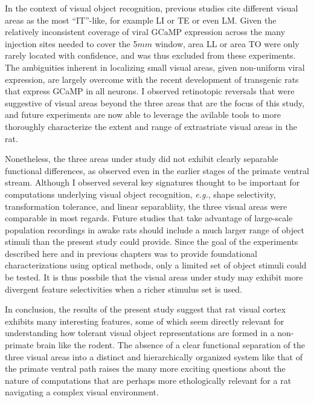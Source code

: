In the context of visual object recognition, previous studies cite different visual areas as the most ``IT''-like, for example LI\cite{Tafazoli2017, Matteucci2019b} or TE\cite{Vermaercke2015, Vermaercke2014} or even LM\cite{Froudarakis2020}. Given the relatively inconsistent coverage of viral GCaMP expression across the many injection sites needed to cover the 5$mm$ window, area LL or area TO were only rarely located with confidence, and was thus excluded from these experiments. The ambiguities inherent in localizing small visual areas, given non-uniform viral expression, are largely overcome with the recent development of transgenic rats that express GCaMP in all neurons\cite{Scott2018}. I observed retinotopic reversals that were suggestive of visual areas beyond the three areas that are the focus of this study, and future experiments are now able to leverage the avilable tools to more thoroughly characterize the extent and range of extrastriate visual areas in the rat. 

Nonetheless, the three areas under study did not exhibit clearly separable functional differences, as observed even in the earlier stages of the primate ventral stream. Although I observed several key signatures thought to be important for computations underlying visual object recognition, \textit{e.g.}, shape selectivity, transformation tolerance, and linear separabliity, the three visual areas were comparable in most regards. Future studies that take advantage of large-scale population recordings in awake rats should include a much larger range of object stimuli than the present study could provide. Since the goal of the experiments described here and in previous chapters was to provide foundational characterizations using optical methods, only a limited set of object stimuli could be tested. It is thus possbile that the visual areas under study may exhibit more divergent feature selectivities when a richer stimulus set is used. 

In conclusion, the results of the present study suggest that rat visual cortex exhibits many interesting features, some of which seem directly relevant for understanding how tolerant visual object representations are formed in a non-primate brain like the rodent. The absence of a clear functional separation of the three visual areas into a distinct and hierarchically organized system like that of the primate ventral path raises the many more exciting questions about the nature of computations that are perhaps more ethologically relevant for a rat navigating a complex visual environment. 
